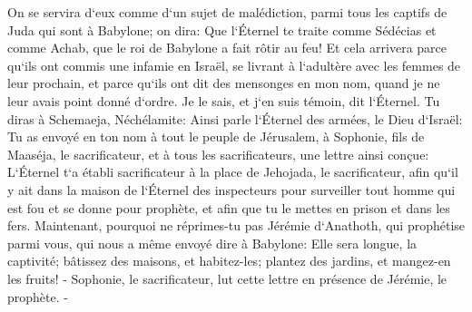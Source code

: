 \verse On se servira d`eux comme d`un sujet de malédiction, parmi tous les captifs de Juda qui sont à Babylone; on dira: Que l`Éternel te traite comme Sédécias et comme Achab, que le roi de Babylone a fait rôtir au feu! 
\verse Et cela arrivera parce qu`ils ont commis une infamie en Israël, se livrant à l`adultère avec les femmes de leur prochain, et parce qu`ils ont dit des mensonges en mon nom, quand je ne leur avais point donné d`ordre. Je le sais, et j`en suis témoin, dit l`Éternel. 
\verse Tu diras à Schemaeja, Néchélamite: 
\verse Ainsi parle l`Éternel des armées, le Dieu d`Israël: Tu as envoyé en ton nom à tout le peuple de Jérusalem, à Sophonie, fils de Maaséja, le sacrificateur, et à tous les sacrificateurs, une lettre ainsi conçue: 
\verse L`Éternel t`a établi sacrificateur à la place de Jehojada, le sacrificateur, afin qu`il y ait dans la maison de l`Éternel des inspecteurs pour surveiller tout homme qui est fou et se donne pour prophète, et afin que tu le mettes en prison et dans les fers. 
\verse Maintenant, pourquoi ne réprimes-tu pas Jérémie d`Anathoth, qui prophétise parmi vous, 
\verse qui nous a même envoyé dire à Babylone: Elle sera longue, la captivité; bâtissez des maisons, et habitez-les; plantez des jardins, et mangez-en les fruits! - 
\verse Sophonie, le sacrificateur, lut cette lettre en présence de Jérémie, le prophète. - 
